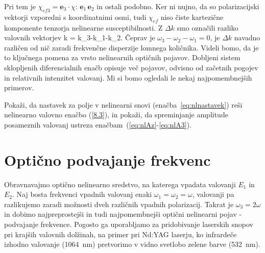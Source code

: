 Pri tem je $\chi_{ef3}=\mathbf{e}_{3}\cdot\chi:\,\mathbf{e}_{1}\,\mathbf{e}_{2}$ in ostali podobno.
Ker ni nujno, da so polarizacijski vektorji vzporedni s koordinatnimi osmi, tudi $\chi_{ef}$ 
niso čiste kartezične komponente tenzorja nelinearne susceptibilnosti. 
Z $\Delta k$ smo označili razliko valovnih vektorjev
\beq
\Delta k = k_{3}-k_{1}-k_{2}.
\eeq
Čeprav je $\omega_{3}-\omega_{2}-\omega_{1}=0$, je $\Delta k$ navadno različen od nič zaradi 
frekvenčne disperzije lomnega količnika. Videli bomo, da je to ključnega pomena 
za vrsto nelinearnih optičnih pojavov. Dobljeni sistem sklopljenih diferencialnih enačb opisuje več pojavov, 
odvisno od začetnih pogojev in relativnih intenzitet valovanj. Mi si bomo ogledali le nekaj
najpomembnejših primerov.
\begin{definition}
Pokaži, da nastavek za polje v nelinearni snovi (enačba~\ref{eq:nlnastavek}) reši nelinearno
valovno enačbo (\ref{8.3}), in pokaži, da spreminjanje amplitude posameznih valovanj 
ustreza enačbam~(\ref{eq:nlAz}-\ref{eq:nlA3}).
\end{definition}

\section{Optično podvajanje frekvenc}
Obravnavajmo optično nelinearno sredstvo, na katerega vpadata valovanji $E_1$ in $E_2$.
Naj bosta frekvenci vpadnih valovanj enaki $\omega_{1}=\omega_{2}=\omega$, valovanji
pa razlikujemo zaradi možnosti dveh različnih vpadnih polarizacij. Takrat je $\omega_{3}=2\omega$
in dobimo najpreprostejši in tudi najpomembnejši optični nelinearni pojav - podvajanje 
frekvence. 
Pogosto ga uporabljamo za pridobivanje laserskih snopov pri krajših valovnih dolžinah, na primer
pri Nd:YAG laserju, ko infrardeče izhodno valovanje (1064~nm) 
pretvorimo v vidno svetlobo zelene barve (532~nm). 

